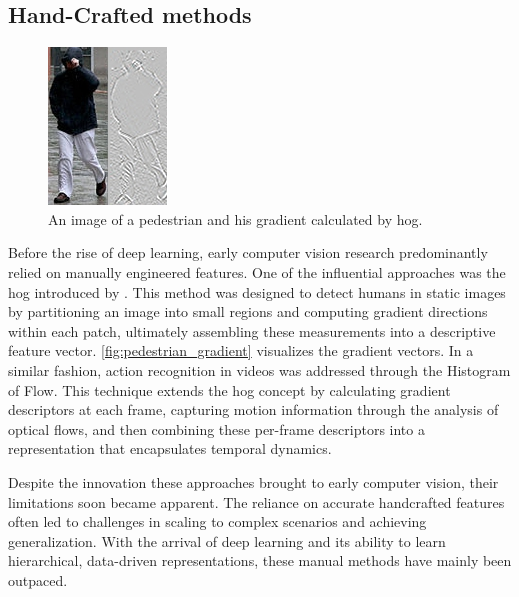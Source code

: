 \subsection{Hand-Crafted methods}

\begin{figure}
    \centering
    \includegraphics[width=0.5\linewidth]{figures/Pedestrian_gradient.jpg}
    \caption{An image of a pedestrian and his gradient calculated by \acrshort{hog}.}
    \label{fig:pedestrian_gradient}
\end{figure}

Before the rise of deep learning, early computer vision research predominantly relied on manually engineered features. One of the influential approaches was the \acrfull{hog} introduced by \textcite{dalal_histogram_of_gradients}. This method was designed to detect humans in static images by partitioning an image into small regions and computing gradient directions within each patch, ultimately assembling these measurements into a descriptive feature vector. \autoref{fig:pedestrian_gradient} visualizes the gradient vectors. In a similar fashion, action recognition in videos was addressed through the Histogram of Flow\cite{dalal_histogram_of_flow}. This technique extends the \acrshort{hog} concept by calculating gradient descriptors at each frame, capturing motion information through the analysis of optical flows, and then combining these per-frame descriptors into a representation that encapsulates temporal dynamics. 

Despite the innovation these approaches brought to early computer vision, their limitations soon became apparent. The reliance on accurate handcrafted features often led to challenges in scaling to complex scenarios and achieving generalization. With the arrival of deep learning and its ability to learn hierarchical, data-driven representations, these manual methods have mainly been outpaced. 

